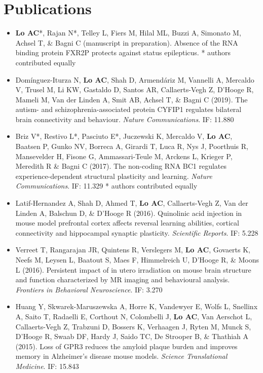 \documentclass{article}
\begin{document}
\section{Publications}

\begin{itemize}
    \item \textbf{Lo AC}*, Rajan N*, Telley L, Fiers M, Hilal ML, Buzzi A, Simonato M, Achsel T, \& Bagni C (manuscript in preparation). Absence of the RNA binding protein FXR2P protects against status epilepticus. * authors contributed equally
    
    \item Dom\'{i}nguez-Iturza N, \textbf{Lo AC}, Shah D, Armend\'{a}riz M, Vannelli A, Mercaldo V, Trusel M, Li KW, Gastaldo D, Santos AR, Callaerts-Vegh Z, D'Hooge R, Mameli M, Van der Linden A, Smit AB, Achsel T, \& Bagni C (2019). The autism- and schizophrenia-associated protein CYFIP1 regulates bilateral brain connectivity and behaviour. \emph{Nature Communications}. IF: 11.880
    
    \item Briz V*, Restivo L*, Pasciuto E*, Juczewski K, Mercaldo V, \textbf{Lo AC}, Baatsen P, Gunko NV, Borreca A, Girardi T, Luca R, Nys J, Poorthuis R, Mansevelder H, Fisone G, Ammassari-Teule M, Arckens L, Krieger P, Meredith R \& Bagni C (2017). The non-coding RNA BC1 regulates experience-dependent structural plasticity and learning. \emph{Nature Communications}. IF: 11.329 * authors contributed equally
    
    \item Latif-Hernandez A, Shah D, Ahmed T, \textbf{Lo AC}, Callaerts-Vegh Z, Van der Linden A, Balschun D, \& D'Hooge R (2016). Quinolinic acid injection in mouse model prefrontal cortex affects reversal learning abilities, cortical connectivity and hippocampal synaptic plasticity. \emph{Scientific Reports}. IF: 5.228
    
    \item Verreet T, Rangarajan JR, Quintens R, Verslegers M, \textbf{Lo AC}, Govaerts K, Neefs M, Leysen L, Baatout S, Maes F, Himmelreich U, D'Hooge R, \& Moons L (2016). Persistent impact of in utero irradiation on mouse brain structure and function characterized by MR imaging and behavioural analysis. \emph{Frontiers in Behavioral Neuroscience}. IF: 3.270 
    
    \item Huang Y, Skwarek-Maruszewska A, Horre K, Vandewyer E, Wolfs L, Snellinx A, Saito T, Radaelli E, Corthout N, Colombelli J, \textbf{Lo AC}, Van Aerschot L, Callaerts-Vegh Z, Trabzuni D, Bossers K, Verhaagen J, Ryten M, Munck S, D'Hooge R, Swaab DF, Hardy J, Saido TC, De Strooper B, \& Thathiah A (2015). Loss of GPR3 reduces the amyloid plaque burden and improves memory in Alzheimer's disease mouse models. \emph{Science Translational Medicine}. IF: 15.843
    

\end{itemize}
\end{document}
